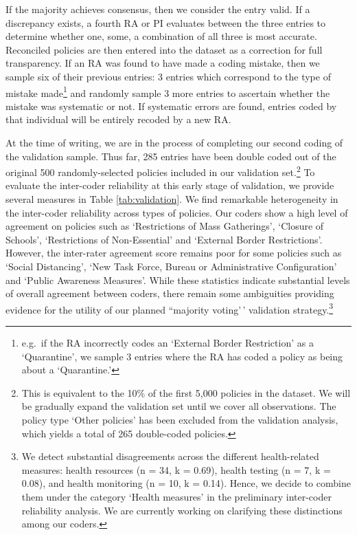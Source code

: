 \documentclass[
]{article}
\begin{document}
If the majority achieves consensus, then we consider the entry valid. If a discrepancy exists, a fourth RA or PI evaluates between the three entries to determine whether one, some, a combination of all three is most accurate. Reconciled policies are then entered into the dataset as a correction for full transparency. If an RA was found to have made a coding mistake, then we sample six of their previous entries: 3 entries which correspond to the type of mistake made\footnote{e.g.~if the RA incorrectly codes an `External Border Restriction' as a `Quarantine', we sample 3 entries where the RA has coded a policy as being about a `Quarantine.'} and randomly sample 3 more entries to ascertain whether the mistake was systematic or not. If systematic errors are found, entries coded by that individual will be entirely recoded by a new RA.

At the time of writing, we are in the process of completing our second coding of the validation sample. Thus far, 285 entries have been double coded out of the original 500 randomly-selected policies included in our validation set.\footnote{This is equivalent to the 10\% of the first 5,000 policies in the dataset. We will be gradually expand the validation set until we cover all observations. The policy type `Other policies' has been excluded from the validation analysis, which yields a total of 265 double-coded policies.} To evaluate the inter-coder reliability at this early stage of validation, we provide several measures in Table \ref{tab:validation}. We find remarkable heterogeneity in the inter-coder reliability across types of policies. Our coders show a high level of agreement on policies such as `Restrictions of Mass Gatherings', `Closure of Schools', `Restrictions of Non-Essential' and `External Border Restrictions'. However, the inter-rater agreement score remains poor for some policies such as `Social Distancing', `New Task Force, Bureau or Administrative Configuration' and `Public Awareness Measures'. While these statistics indicate substantial levels of overall agreement between coders, there remain some ambiguities providing evidence for the utility of our planned ``majority voting'\,' validation strategy.\footnote{We detect substantial disagreements across the different health-related measures: health resources (n = 34, k = 0.69), health testing (n = 7, k = 0.08), and health monitoring (n = 10, k = 0.14). Hence, we decide to combine them under the category `Health measures' in the preliminary inter-coder reliability analysis. We are currently working on clarifying these distinctions among our coders.}
\end{document}
